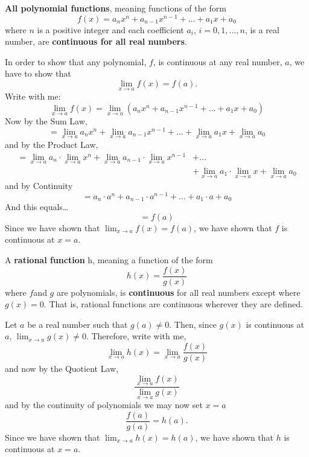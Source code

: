 \documentclass{ximera}
\begin{document}
\begin{theorem}
 \textbf{All polynomial functions}, meaning functions of the form
  \[
  f(x) = a_nx^n + a_{n-1}x^{n-1} + \dots + a_1 x + a_0
  \]
  where $n$ is a positive integer  and each coefficient $a_i$, $i=0, 1,...,n$, is a real number, are
  \textbf{continuous for all real numbers}.
  \begin{explanation}
  In order to show that any polynomial, $f$, is continuous at any real number, $a$, we have to show that
  \[
  \lim_{x\to a} f(x)=f(a).
  \]
  Write with me:
  \[
  \lim_{x\to a} f(x) = \lim_{x\to a} (a_nx^n + a_{n-1}x^{n-1} + \dots + a_1 x + a_0 )
  \]
  Now by the Sum Law,
  \[
  = \lim_{x\to a} a_nx^n + \lim_{x\to a} a_{n-1}x^{n-1} + \dots +  \lim_{x\to a}a_1 x + \lim_{x\to a} a_0
  \]
  and by the Product Law,
  \begin{align*}
    = \lim_{x\to a} a_n\cdot \lim_{x\to a}x^n + \lim_{x\to a} a_{n-1}\cdot \lim_{x\to a}x^{n-1} &+ \dots\\
    &+  \lim_{x\to a}a_1 \cdot \lim_{x\to a}x + \lim_{x\to a} a_0
  \end{align*}
  and by Continuity
  \[
  = a_n\cdot a^n +  a_{n-1}\cdot a^{n-1} + \dots + a_1 \cdot a + a_0
  \]
  And this equals\dots
  \[
  =f(a)
  \]
  Since we have shown that $\lim_{x\to a} f(x) = f(a)$, we have
  shown that $f$ is continuous at $x=a$.
\end{explanation}
\end{theorem}

\begin{theorem}
   A \textbf{rational function} h, meaning a function of the form
  \[
  h(x)=\frac{f(x)}{g(x)}
  \]
  where $f $and $g$ are polynomials, is \textbf{continuous} for all real numbers except where $g(x)=0$.  That is,
  rational functions are continuous wherever they are defined.
\begin{explanation}
      Let $a$ be a real number such that $g(a)\neq 0$.  Then, since
      $g(x)$ is continuous at $a$, $\lim_{x\to a} g(x) \neq 0$.
      Therefore, write with me,
      \[
      \lim_{x \to a} h(x) = \lim_{x\to a} \frac{f(x)}{g(x)}
      \]
      and now by the Quotient Law,
      \[
      \frac{\lim_{x\to a} f(x)}{ \lim_{x\to a} g(x)}
      \]
      and by the continuity of polynomials we may now set $x=a$
      \[
      \frac{f(a)}{g(a)}=h(a).
      \]
      Since we have shown that $\lim_{x\to a} h(x) = h(a)$, we have
      shown that $h$ is continuous at $x=a$.
\end{explanation}
\end{theorem}
\end{document}
